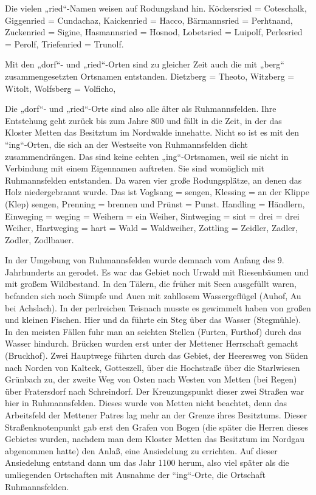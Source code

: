 \documentclass[12pt,a4paper]{book}
\begin{document}
Die vielen „ried“-Namen weisen auf Rodungsland hin. Köckersried = Coteschalk,
Giggenried = Cundachaz, Kaickenried = Hacco, Bärmannsried = Perhtnand,
Zuckenried = Sigine, Hasmannsried = Hosnod, Lobetsried = Luipolf, Perlesried =
Perolf, Triefenried = Trunolf.

Mit den „dorf“- und „ried“-Orten sind zu gleicher Zeit auch die mit „berg“
zusammengesetzten Ortsnamen entstanden. Dietzberg = Theoto, Witzberg = Witolt,
Wolfsberg = Volficho,

Die „dorf“- und „ried“-Orte sind also alle älter als Ruhmannsfelden. Ihre
Entstehung geht zurück bis zum Jahre 800 und fällt in die Zeit, in der das
Kloster Metten das Besitztum im Nordwalde innehatte. Nicht so ist es mit den
“ing“-Orten, die sich an der Westseite von Ruhmannsfelden dicht zusammendrängen.
Das sind keine echten „ing“-Ortsnamen, weil sie nicht in Verbindung mit einem
Eigennamen auftreten. Sie sind womöglich mit Ruhmannsfelden entstanden. Da waren
vier große Rodungsplätze, an denen das Holz niedergebrannt wurde. Das ist
Voglsang = sengen, Klessing = an der Klippe (Klep) sengen, Prenning = brennen
und Prünst = Punst. Handling = Händlern, Einweging = weging = Weihern = ein
Weiher, Sintweging = sint = drei = drei Weiher, Hartweging = hart = Wald =
Waldweiher, Zottling = Zeidler, Zadler, Zodler, Zodlbauer.

In der Umgebung von Ruhmannsfelden wurde demnach vom Anfang des 9. Jahrhunderts
an gerodet. Es war das Gebiet noch Urwald mit Riesenbäumen und mit großem
Wildbestand. In den Tälern, die früher mit Seen ausgefüllt waren, befanden sich
noch Sümpfe und Auen mit zahllosem Wassergeflügel (Auhof, Au bei Achslach). In
der perlreichen Teisnach musste es gewimmelt haben von großen und kleinen
Fischen. Hier und da führte ein Steg über das Wasser (Stegmühle). In den meisten
Fällen fuhr man an seichten Stellen (Furten, Furthof) durch das Wasser hindurch.
Brücken wurden erst unter der Mettener Herrschaft gemacht (Bruckhof). Zwei
Hauptwege führten durch das Gebiet, der Heeresweg von Süden nach Norden von
Kalteck, Gotteszell, über die Hochstraße über die Starlwiesen Grünbach zu, der
zweite Weg von Osten nach Westen von Metten (bei Regen) über Fratersdorf nach
Schreindorf. Der Kreuzungspunkt dieser zwei Straßen war hier in Ruhmannsfelden.
Dieses wurde von Metten nicht beachtet, denn das Arbeitsfeld der Mettener Patres
lag mehr an der Grenze ihres Besitztums. Dieser Straßenknotenpunkt gab erst den
Grafen von Bogen (die später die Herren dieses Gebietes wurden, nachdem man dem
Kloster Metten das Besitztum im Nordgau abgenommen hatte) den Anlaß, eine
Ansiedelung zu errichten. Auf dieser Ansiedelung entstand dann um das Jahr 1100
herum, also viel später als die umliegenden Ortschaften mit Ausnahme der
“ing“-Orte, die Ortschaft Ruhmannsfelden.
\end{document}
